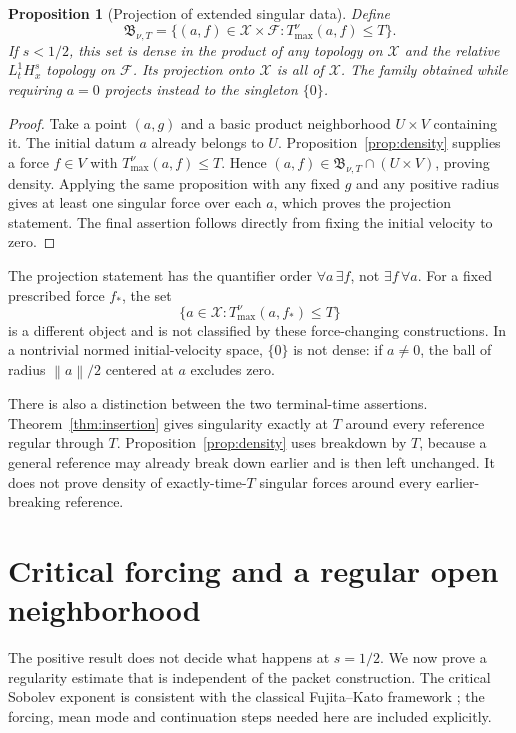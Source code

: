 \documentclass[11pt,a4paper]{article}
\newtheorem{proposition}[theorem]{Proposition}
\theoremstyle{definition}\newtheorem{definition}[theorem]{Definition}
\theoremstyle{remark}\newtheorem{remark}[theorem]{Remark}
\newcommand{\FF}{\mathcal F}\newcommand{\XX}{\mathcal X}
\newcommand{\norm}[1]{\left\lVert#1\right\rVert}
\begin{document}
\begin{proposition}[Projection of extended singular data]\label{prop:projection}
Define
\[
 \mathfrak B_{\nu,T}
 =\{(a,f)\in\XX\times\FF:T_{\max}^{\nu}(a,f)\le T\}.
\]
If $s<1/2$, this set is dense in the product of any topology on $\XX$ and the relative $L^1_tH^s_x$ topology on $\FF$. Its projection onto $\XX$ is all of $\XX$.
The family obtained while requiring $a=0$ projects instead to the singleton $\{0\}$.
\end{proposition}
\begin{proof}
Take a point $(a,g)$ and a basic product neighborhood $U\times V$ containing it. The initial datum $a$ already belongs to $U$. Proposition~\ref{prop:density} supplies a force $f\in V$ with $T_{\max}^{\nu}(a,f)\le T$. Hence
$(a,f)\in\mathfrak B_{\nu,T}\cap(U\times V)$, proving density.
Applying the same proposition with any fixed $g$ and any positive radius gives at least one singular force over each $a$, which proves the projection statement. The final assertion follows directly from fixing the initial velocity to zero.
\end{proof}

The projection statement has the quantifier order
$\forall a\,\exists f$, not $\exists f\,\forall a$.
For a fixed prescribed force $f_*$, the set
\[
 \{a\in\XX:T_{\max}^{\nu}(a,f_*)\le T\}
\]
is a different object and is not classified by these force-changing constructions.
In a nontrivial normed initial-velocity space, $\{0\}$ is not dense: if
$a\ne0$, the ball of radius $\norm{a}/2$ centered at $a$ excludes zero.

There is also a distinction between the two terminal-time assertions.
Theorem~\ref{thm:insertion} gives singularity exactly at $T$ around every reference regular through $T$. Proposition~\ref{prop:density} uses breakdown by $T$, because a general reference may already break down earlier and is then left unchanged. It does not prove density of exactly-time-$T$ singular forces around every earlier-breaking reference.

\section{Critical forcing and a regular open neighborhood}\label{sec:critical}
The positive result does not decide what happens at $s=1/2$. We now prove a regularity estimate that is independent of the packet construction. The critical Sobolev exponent is consistent with the classical Fujita--Kato framework \cite{fujita}; the forcing, mean mode and continuation steps needed here are included explicitly.
\end{document}
